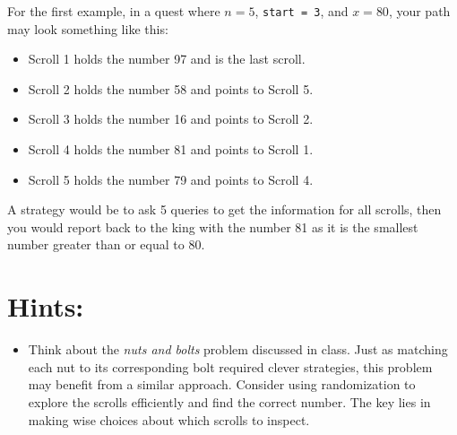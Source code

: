 For the first example, in a quest where $n = 5$, \texttt{start = 3}, and $x = 80$, your path may look something like this:
\begin{itemize}
    \item Scroll 1 holds the number 97 and is the last scroll.
    \item Scroll 2 holds the number 58 and points to Scroll 5.
    \item Scroll 3 holds the number 16 and points to Scroll 2.
    \item Scroll 4 holds the number 81 and points to Scroll 1.
    \item Scroll 5 holds the number 79 and points to Scroll 4.
\end{itemize}

A strategy would be to ask 5 queries to get the information for all scrolls, then you would report back to the king with the number 81 as it is the smallest number greater than or equal to 80.

\section*{Hints: }
\begin{itemize}
\item Think about the \textit{nuts and bolts} problem discussed in class. Just as matching each nut to its corresponding bolt required clever strategies, this problem may benefit from a similar approach. Consider using randomization to explore the scrolls efficiently and find the correct number. The key lies in making wise choices about which scrolls to inspect.
\end{itemize}